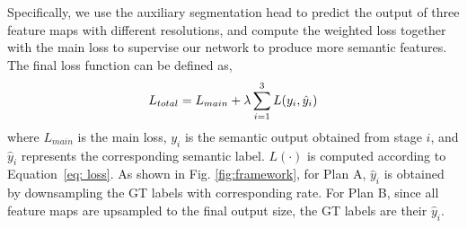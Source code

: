 \documentclass{article}
\begin{document}
Specifically, we use the auxiliary segmentation head to predict the output of three feature maps with different resolutions, and compute the weighted loss together with the main loss to supervise our network to produce more semantic features. The final loss function can be defined as,
\vspace{-1ex}
\begin{equation}
\label{eq: final_loss}
L_{total}=L_{main} + \lambda \sum_{i=1}^{3}L(y_{i},\hat{y}_{i})
\vspace{-1ex}
\end{equation}
where $L_{main}$ is the main loss, $y_{i}$ is the semantic output obtained from stage $i$, and $\hat{y}_{i}$ represents the corresponding semantic label. $L(\cdot)$ is computed according to Equation~\ref{eq: loss}. As shown in Fig. \ref{fig:framework}, for Plan A,  $\hat{y}_{i}$ is obtained by downsampling the GT labels with corresponding rate. For Plan B, since all feature maps are upsampled to the final output size, the GT labels are their $\hat{y}_{i}$.
\end{document}
